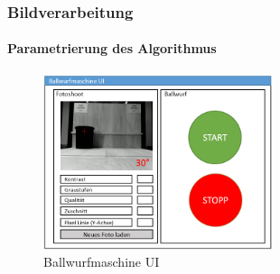 \begin{frame}
	\frametitle{Bildverarbeitung\hfill{}\footnotesize \group}
	\framesubtitle{Parametrierung des Algorithmus}
	
	\begin{figure}
		\centering
		\includegraphics[width=0.6\textwidth]{../../fig/fotoshoot-configurator.png}
		\caption{Ballwurfmaschine UI}
	\end{figure}
	
\end{frame}
